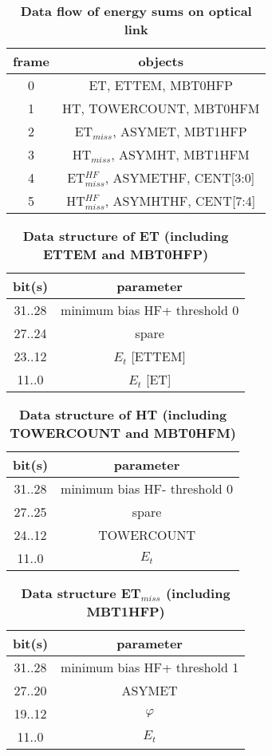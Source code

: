 \documentclass{cmspaper}
\begin{document}
\begin{table}[ht]
\caption{\bf Data flow of energy sums on optical link}
\vspace{5mm}
\centering
\begin{tabular}{|c|c|}\hline
frame & objects \\\hline\hline
0 & ET, ETTEM, MBT0HFP \\\hline
1 & HT, TOWERCOUNT, MBT0HFM \\\hline
2 & ET$_{miss}$, ASYMET, MBT1HFP \\\hline
3 & HT$_{miss}$, ASYMHT, MBT1HFM \\\hline
4 & ET$_{miss}^{HF}$, ASYMETHF, CENT[3:0] \\\hline
5 & HT$_{miss}^{HF}$, ASYMHTHF, CENT[7:4] \\\hline
\end{tabular}
\label{table:opt_link_esums}
\end{table}

\begin{table}[ht]
\caption{\bf Data structure of ET \rm(including ETTEM and MBT0HFP)}
\vspace{5mm}
\centering
\begin{tabular}{|c|c|}\hline
bit(s) & parameter \\\hline\hline
31..28 & minimum bias HF+ threshold 0 \\
27..24 & spare \\
23..12 & $E_t$ [ETTEM] \\
11..0 & $E_t$ [ET] \\\hline
\end{tabular}
\label{table:ett_object}
\end{table}

\begin{table}[ht]
\caption{\bf Data structure of HT \rm(including TOWERCOUNT and MBT0HFM)}
\vspace{5mm}
\centering
\begin{tabular}{|c|c|}\hline
bit(s) & parameter \\\hline\hline
31..28 & minimum bias HF- threshold 0 \\
27..25 & spare \\
24..12 & TOWERCOUNT \\
11..0 & $E_t$ \\\hline
\end{tabular}
\label{table:ht_object}
\end{table}

\begin{table}[ht]
\caption{\bf Data structure ET$_{miss}$ \rm(including MBT1HFP)}
\vspace{5mm}
\centering
\begin{tabular}{|c|c|}\hline
bit(s) & parameter \\\hline\hline
31..28 & minimum bias HF+ threshold 1 \\
27..20 & ASYMET \\
19..12 & $\varphi$ \\
11..0 & $E_t$ \\\hline
\end{tabular}
\label{table:etm_object}
\end{table}
\end{document}
